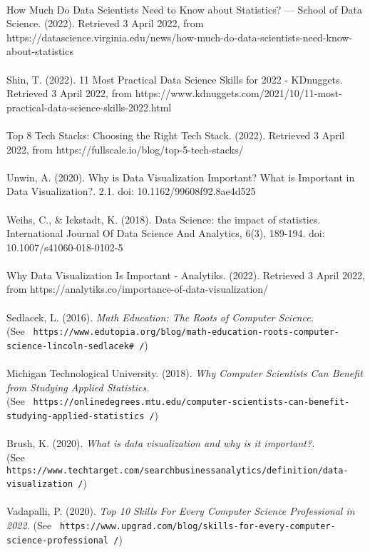 \documentclass[a4paper, 11pt]{report}
\begin{document}
	\\
	How Much Do Data Scientists Need to Know about Statistics? — School of Data Science. (2022). Retrieved 3 April 2022, from https://datascience.virginia.edu/news/how-much-do-data-scientists-need-know-about-statistics
	\\
	\\
	Shin, T. (2022). 11 Most Practical Data Science Skills for 2022 - KDnuggets. Retrieved 3 April 2022, from https://www.kdnuggets.com/2021/10/11-most-practical-data-science-skills-2022.html
	\\
	\\
	Top 8 Tech Stacks: Choosing the Right Tech Stack. (2022). Retrieved 3 April 2022, from https://fullscale.io/blog/top-5-tech-stacks/
	\\
	\\
	Unwin, A. (2020). Why is Data Visualization Important? What is Important in Data Visualization?. 2.1. doi: 10.1162/99608f92.8ae4d525
	\\
	\\
	Weihs, C., \& Ickstadt, K. (2018). Data Science: the impact of statistics. International Journal Of Data Science And Analytics, 6(3), 189-194. doi: 10.1007/s41060-018-0102-5
	\\
	\\
	Why Data Visualization Is Important - Analytiks. (2022). Retrieved 3 April 2022, from https://analytiks.co/importance-of-data-visualization/
	\\
	\\
	Sedlacek, L. (2016). \textit{ Math Education: The Roots of Computer Science.} \\(See \texttt{ https://www.edutopia.org/blog/math-education-roots-computer-science-lincoln-sedlacek# /})
	\\
	\\
	Michigan Technological University. (2018). \textit{ Why Computer Scientists Can Benefit from Studying Applied Statistics.}\\ (See \texttt{ https://onlinedegrees.mtu.edu/computer-scientists-can-benefit-studying-applied-statistics /})
	\\
	\\
	Brush, K. (2020). \textit{ What is data visualization and why is it important?.} \\(See \texttt{ https://www.techtarget.com/searchbusinessanalytics/definition/data-visualization /})
	\\
	\\
	Vadapalli, P. (2020). \textit{ Top 10 Skills For Every Computer Science Professional in 2022.} (See \texttt{ https://www.upgrad.com/blog/skills-for-every-computer-science-professional /})
\end{document}
